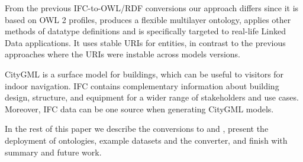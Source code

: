 

From the previous IFC-to-OWL/RDF conversions
\cite{beetz2005ontology,beetz2009ifcowl,pauwels2011interoperability} our approach differs since it
is based on OWL 2 profiles, produces a flexible multilayer ontology, applies other methods of data\-type definitions and is specifically targeted to
real-life Linked Data applications. It uses stable URIs for entities, in contrast to the previous approaches
where the URIs were instable across models versions.

CityGML \cite{kolbe2005citygml} is a surface model for buildings, which can be useful to visitors for 
indoor navigation. IFC contains complementary information about building design, structure, 
and equipment for a wider range of stakeholders and use cases. Moreover, IFC data can be one source 
when generating CityGML models. %

In the rest of this paper we describe the conversions to \ifcowl{} and \ifcrdf{}, present the deployment of ontologies, example datasets and the converter, and finish with summary and future work. 

